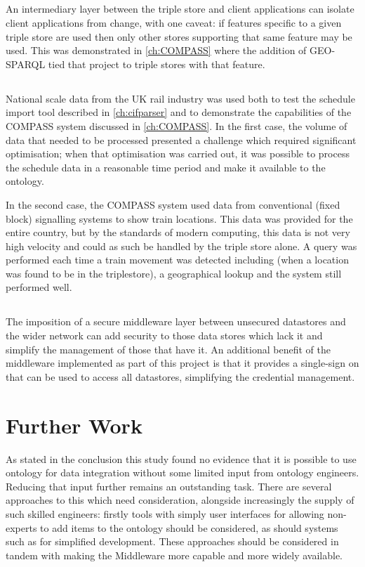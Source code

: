 \subsection{\QuestionChange}
An intermediary layer between the triple store and client applications can isolate client applications from change, with one caveat: if features specific to a given triple store are used then only other stores supporting that same feature may be used. This was demonstrated in \autoref{ch:COMPASS} where the addition of GEO-SPARQL tied that project to triple stores with that feature.

\subsection{\QuestionCanOntologyScale}
National scale data from the UK rail industry was used both to test the schedule import tool described in \autoref{ch:cifparser} and to demonstrate the capabilities of the COMPASS system discussed in \autoref{ch:COMPASS}. In the first case, the volume of data that needed to be processed presented a challenge which required significant optimisation; when that optimisation was carried out, it was possible to process the schedule data in a reasonable time period and make it available to the ontology. 

In the second case, the COMPASS system used data from conventional (fixed block) signalling systems to show train locations. This data was provided for the entire country, but by the standards of modern computing, this data is not very high velocity and could as such be handled by the triple store alone. A query was performed each time a train movement was detected including (when a location was found to be in the triplestore), a geographical lookup and the system still performed well.

\subsection{\QuestionSecurity}
The imposition of a secure middleware layer between unsecured datastores and the wider network can add security to those data stores which lack it and simplify the management of those that have it. An additional benefit of the middleware implemented as part of this project is that it provides a single-sign on that can be used to access all datastores, simplifying the credential management.

\section{Further Work}
As stated in the conclusion this study found no evidence that it is possible to use ontology for data integration without some limited input from ontology engineers. Reducing that input further remains an outstanding task. There are several approaches to this which need consideration, alongside increasingly the supply of such skilled engineers: firstly tools with simply user interfaces for allowing non-experts to add items to the ontology should be considered, as should systems such as  for simplified development. These approaches should be considered in tandem with making the Middleware more capable and more widely available. 

